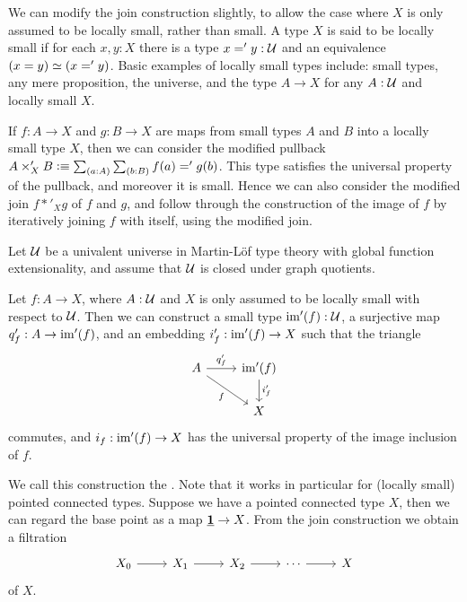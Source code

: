 \documentclass[reqno]{amsart}
\begin{document}
We can modify the join construction slightly, to allow the case where $X$ is only assumed to be locally small, rather than small. A type $X$ is said to be locally small if for each $x,y:X$ there is a type $x='y:\mathcal{U}$ and an equivalence $\eqv{(x=y)}{(x='y)}$. Basic examples of locally small types include: small types, any mere proposition, the universe, and the type $A\to X$ for any $A:\mathcal{U}$ and locally small $X$. 

If $f:A\to X$ and $g:B\to X$ are maps from small types $A$ and $B$ into a locally small type $X$, then we can
consider the modified pullback $A\times'_X B\defeq \sm{a:A}{b:B}f(a)='g(b)$. This type satisfies the universal property of the pullback, and moreover it is small. Hence we can also consider the modified join $f\ast'_X g$ of $f$ and $g$, and follow through the construction of the image of $f$ by iteratively  joining $f$ with itself, using the modified join. 

\begin{thm}\label{defn:modified-join}
Let $\mathcal{U}$ be a univalent universe in Martin-L\"of type theory with global function extensionality, 
and assume that $\mathcal{U}$ is closed under graph quotients. 

Let $f:A\to X$, where $A:\mathcal{U}$ and $X$ is only assumed to be locally small with respect to $\mathcal{U}$.
Then we can construct a small type $\operatorname{im}'(f):\mathcal{U}$, a surjective map $q'_f:A\to\operatorname{im}'(f)$, and an embedding $i'_f:\operatorname{im}'(f)\to X$ such that the triangle
\begin{equation*}
\begin{tikzcd}
A \arrow[r,"{q'_f}"] \arrow[dr,swap,"f"] & \im'(f) \arrow[d,"{i'_f}"] \\
& X
\end{tikzcd}
\end{equation*}
commutes, and $i_f:\operatorname{im}'(f)\to X$ has the universal property of the image inclusion of $f$.
\end{thm}

We call this construction the . Note that it works
in particular for (locally small) pointed connected types. Suppose we have a pointed connected
type $X$, then we can regard the base point as a map $\underline{\mathbf{1}}\to X$. From the
join construction we obtain a filtration
\begin{equation*}
\begin{tikzcd}
X_0 \arrow[r] & X_1 \arrow[r] & X_2 \arrow[r] & \cdots \arrow[r] & X
\end{tikzcd}
\end{equation*}
of $X$. 
\end{document}
